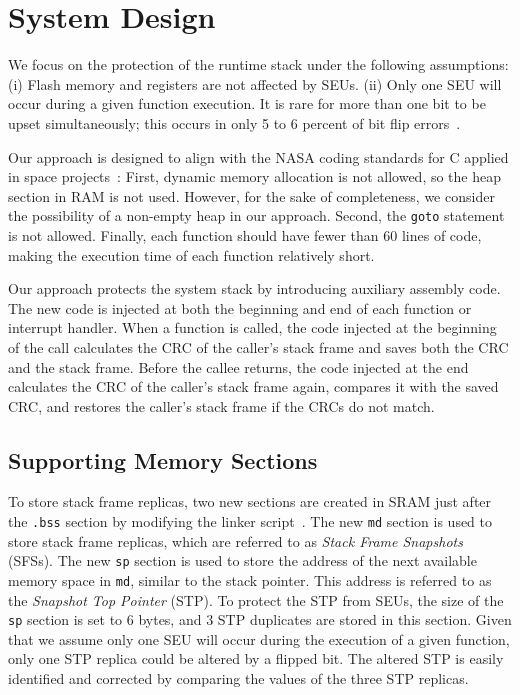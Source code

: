 \vspace{-15pt}
\section{System Design}\label{sec:design}
\vspace{-10pt}
We focus on the protection of the runtime stack under the following assumptions: (i) Flash memory and registers are not affected by SEUs. (ii) Only one SEU will occur during a given function execution. It is rare for more than one bit to be upset simultaneously; this occurs in only 5 to 6 percent of bit flip errors~\cite{underwood1992sramorbit}. 

Our approach is designed to align with the NASA coding standards for C applied in space projects~\cite{nasa_coding_standard}: First, dynamic memory allocation is not allowed, so the heap section in RAM is not used. However, for the sake of completeness, we consider the possibility of a non-empty heap in our approach. Second, the \texttt{goto} statement is not allowed. Finally, each function should have fewer than 60 lines of code, making the execution time of each function relatively short.

Our approach protects the system stack by introducing auxiliary assembly code. The new code is injected at both the beginning and end of each function or interrupt handler. When a function is called, the code injected at the beginning of the call calculates the CRC of the caller's stack frame and saves both the CRC and the stack frame. Before the callee returns, the code injected at the end calculates the CRC of the caller's stack frame again, compares it with the saved CRC, and restores the caller's stack frame if the CRCs do not match. 
\vspace{-15pt}
\subsection{Supporting Memory Sections}\label{sec:memory_sections}
\vspace{-5pt}
To store stack frame replicas, two new sections are created in SRAM just after the \texttt{.bss} section by modifying the linker script~\cite{linkerscript}. The new \texttt{md} section is used to store stack frame replicas, which are referred to as \textit{Stack Frame Snapshots} (SFSs). The new \texttt{sp} section is used to store the address of the next available memory space in \texttt{md}, similar to the stack pointer. This address is referred to as the \textit{Snapshot Top Pointer} (STP). To protect the STP from SEUs, the size of the \texttt{sp} section is set to 6 bytes, and 3 STP duplicates are stored in this section. Given that we assume only one SEU will occur during the execution of a given function, only one STP replica could be altered by a flipped bit. The altered STP is easily identified and corrected by comparing the values of the three STP replicas.
\vspace{-15pt}
